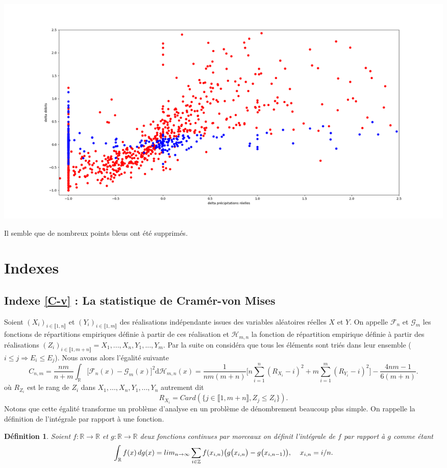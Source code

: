 \documentclass[a4paper,11pt]{article}
\newtheorem{definition}{Définition}
\begin{document}
\begin{center}
	\captionsetup{type=figure}
	\includegraphics[scale=0.33]{classification_deb_prr.png}
\end{center}

Il semble que de nombreux points bleus ont été supprimés. 
\newpage

\section{Indexes}

\subsection{Indexe \ref{C-v} : La statistique de Cramér-von Mises}
\label{lemme Cramer-von Mise}
Soient $(X_i)_{i\in \llbracket 1,n \rrbracket}$ et $(Y_i)_{i\in \llbracket 1,m \rrbracket }$ des réalisations indépendante issues des variables aléatoires réelles $X$ et $Y$. On appelle $\mathcal{F}_{n}$ et $\mathcal{G}_{m}$ les fonctions de répartitions empiriques définie à partir de ces réalisation et $\mathcal{H}_{m,n}$ la fonction de répartition empirique définie à partir des réalisations $(Z_i)_{i\in \llbracket 1,m+n \rrbracket }=X_1,...,X_n,Y_1,...,Y_m$. Par la suite on considéra que tous les éléments sont triés dans leur ensemble ($i\leq j \Rightarrow E_i\leq E_j$). Nous avons alors l'égalité suivante
\begin{equation}
	C_{n,m}=\frac{nm}{n+m}\int_{\mathbb{R}}\big[ \mathcal{F}_{n}(x)-\mathcal{G}_{m}(x)\big]^{2} \mathrm{d} \mathcal{H}_{m,n}(x)=\frac{1}{nm(m+n)}\Big[ n\sum_{i=1}^{n}(R_{X_i}-i)^2+ m\sum_{i=1}^{m}(R_{Y_i}-i)^2\Big]-\frac{4nm-1}{6(m+n)}.
\end{equation}
	où $R_{Z_i}$ est le rang de $Z_i$ dans $X_1,...,X_n,Y_1,...,Y_n$ autrement dit 
	\[R_{X_i}=Card(\{j \in \llbracket 1,m+n \rrbracket , Z_j\leq Z_i\}).\] 
Notons que cette égalité transforme un problème d'analyse en un problème de dénombrement beaucoup plus simple. On rappelle la définition de l'intégrale par rapport à une fonction.
\begin{definition}
	Soient $f:\mathbb{R} \to \mathbb{R}$ et $g:\mathbb{R} \to \mathbb{R}$ deux fonctions continues par morceaux on définit l'intégrale de $f$ par rapport à $g$ comme étant
	\[\int_{\mathbb{R}}f(x)\, dg(x)=lim_{n\to\infty}\sum_{i \in \mathbb{Z}}f(x_{i,n})\big( g\big(x_{i,n}\big)-g\big(x_{i,n-1})\big),\hspace{4mm}x_{i,n}=i/n.\]
\end{definition}
\end{document}
